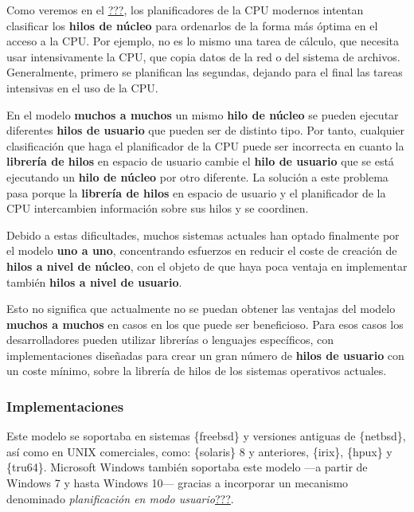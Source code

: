 Como veremos en el \hyperref[planificaciuxf3n_de_la_cpu]{???}, los
planificadores de la CPU modernos intentan clasificar los \textbf{hilos
de núcleo} para ordenarlos de la forma más óptima en el acceso a la CPU.
Por ejemplo, no es lo mismo una tarea de cálculo, que necesita usar
intensivamente la CPU, que copia datos de la red o del sistema de
archivos. Generalmente, primero se planifican las segundas, dejando para
el final las tareas intensivas en el uso de la CPU.

En el modelo \textbf{muchos a muchos} un mismo \textbf{hilo de núcleo}
se pueden ejecutar diferentes \textbf{hilos de usuario} que pueden ser
de distinto tipo. Por tanto, cualquier clasificación que haga el
planificador de la CPU puede ser incorrecta en cuanto la
\textbf{librería de hilos} en espacio de usuario cambie el \textbf{hilo
de usuario} que se está ejecutando un \textbf{hilo de núcleo} por otro
diferente. La solución a este problema pasa porque la \textbf{librería
de hilos} en espacio de usuario y el planificador de la CPU intercambien
información sobre sus hilos y se coordinen.

Debido a estas dificultades, muchos sistemas actuales han optado
finalmente por el modelo \textbf{uno a uno}, concentrando esfuerzos en
reducir el coste de creación de \textbf{hilos a nivel de núcleo}, con el
objeto de que haya poca ventaja en implementar también \textbf{hilos a
nivel de usuario}.

Esto no significa que actualmente no se puedan obtener las ventajas del
modelo \textbf{muchos a muchos} en casos en los que puede ser
beneficioso. Para esos casos los desarrolladores pueden utilizar
librerías o lenguajes específicos, con implementaciones diseñadas para
crear un gran número de \textbf{hilos de usuario} con un coste mínimo,
sobre la librería de hilos de los sistemas operativos actuales.

\subsubsection{Implementaciones}\label{_implementaciones_4}

Este modelo se soportaba en sistemas \{freebsd\} y versiones antiguas de
\{netbsd\}, así como en UNIX comerciales, como: \{solaris\} 8 y
anteriores, \{irix\}, \{hpux\} y \{tru64\}. Microsoft Windows también
soportaba este modelo ---a partir de Windows 7 y hasta Windows 10---
gracias a incorporar un mecanismo denominado \emph{planificación en modo
usuario}\hyperref[Win32-UserModeScheduling]{???}.


